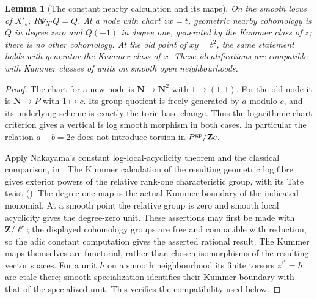 \documentclass[11pt]{article}
\newtheorem{lemma}[theorem]{Lemma}
\theoremstyle{definition}
\theoremstyle{remark}
\begin{document}
\begin{lemma}[The constant nearby calculation and its maps]
\label{lem:constant-nearby}
On the smooth locus of $X'_s$, $R\Psi_{X'}Q=Q$.  At a node with chart
$zw=t$, geometric nearby cohomology is $Q$ in degree zero and
$Q(-1)$ in degree one, generated by the Kummer class of $z$; there
is no other cohomology.  At the old point of $xy=t^2$, the same
statement holds with generator the Kummer class of $x$.
These identifications are compatible with Kummer classes of units on
smooth open neighbourhoods.
\end{lemma}
\begin{proof}
The chart for a new node is $\mathbf N\to\mathbf N^2$ with
$1\mapsto(1,1)$.  For the old node it is $\mathbf N\to P$ with
$1\mapsto c$.  Its group quotient is freely generated by $a$ modulo
$c$, and its underlying scheme is exactly the toric base change.
Thus the logarithmic chart criterion gives a vertical fs log smooth
morphism in both cases.  In particular the relation $a+b=2c$ does
not introduce torsion in $P^{\rm gp}/\mathbf Zc$.

Apply Nakayama's constant log-local-acyclicity theorem and the
classical comparison, in \cite[Theorem 8.3, Corollary 8.4]{IllusieOverview}.
The Kummer calculation of the resulting geometric log fibre gives
exterior powers of the relative rank-one characteristic group, with
its Tate twist (\cite[\S5]{IllusieOverview}).  The degree-one map is the actual
Kummer boundary of the indicated monomial.  At a smooth point the
relative group is zero and smooth local acyclicity gives the degree-zero
unit.  These assertions may first be made with $\mathbf Z/\ell^r$;
the displayed cohomology groups are free and compatible with reduction,
so the adic constant computation gives the asserted rational result.
The Kummer maps themselves are functorial, rather than chosen
isomorphisms of the resulting vector spaces.  For a unit $h$ on a
smooth neighbourhood its finite torsors $z^{\ell^r}=h$ are etale
there; smooth specialization identifies their Kummer boundary with
that of the specialized unit.  This verifies the compatibility used
below.
\end{proof}
\end{document}
